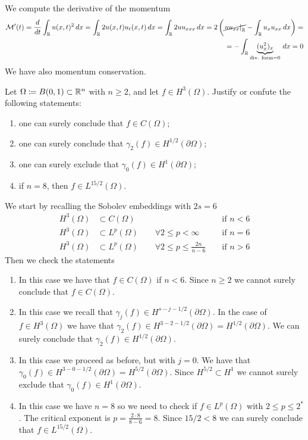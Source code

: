 We compute the derivative of the momentum
\[
    \begin{split}
        \mathcal{M}'(t) = \frac{d}{dt} \int_{\mathbb{R}} u(x,t)^2 \, dx = \int_{\mathbb{R}} 2 u(x,t) u_t(x,t) \, dx = \int_{\mathbb{R}} 2 u u_{xxx} \, dx = 2\left(\cancel{\left. u u_{xx} \right|_{\mathbb{R}}} - \int_{\mathbb{R}} u_x u_{xx} \, dx\right) = \\
        = - \int_{\mathbb{R}} \underbrace{(u_x^2)_x}_{\text{div. form} = 0} \, dx = 0
    \end{split}
\]
We have also momentum conservation.

\newpage
\begin{exercise}
    Let \(\Omega \coloneqq B(0, 1) \subset \mathbb{R}^n\) with \(n \geq 2\), and let \(f \in H^3(\Omega)\). Justify or confute the following statements:
    \begin{enumerate}
        \item one can surely conclude that \(f \in C(\Omega)\);
        \item one can surely conclude that \(\gamma_2(f) \in H^{1/2}(\partial\Omega)\);
        \item one can surely exclude that \(\gamma_0(f) \in H^{1}(\partial\Omega)\);
        \item if \(n = 8\), then \(f \in L^{15/2}(\Omega)\).
    \end{enumerate}
\end{exercise}
We start by recalling the Sobolev embeddings with \(2s = 6\)
\begin{align*}
    H^3(\Omega) &\subset C(\Omega) && \text{ if } n < 6 \\
    H^3(\Omega) &\subset L^p(\Omega) \qquad \forall 2 \leq p < \infty && \text{ if } n = 6 \\
    H^3(\Omega) &\subset L^p(\Omega) \qquad \forall 2 \leq p \leq \frac{2n}{n - 6} && \text{ if } n > 6
\end{align*}
Then we check the statements
\begin{enumerate}
    \item In this case we have that \(f \in C(\Omega)\) if \(n < 6\). Since \(n \geq 2\) we cannot surely conclude that \(f \in C(\Omega)\).
    \item In this case we recall that \(\gamma_j(f) \in H^{s - j - 1/2}(\partial\Omega)\). In the case of \(f \in H^3(\Omega)\) we have that \(\gamma_2(f) \in H^{3 - 2 - 1/2}(\partial\Omega) = H^{1/2}(\partial\Omega)\). We can surely conclude that \(\gamma_2(f) \in H^{1/2}(\partial\Omega)\).
    \item In this case we proceed as before, but with \(j = 0\). We have that \(\gamma_0(f) \in H^{3 - 0 - 1/2}(\partial\Omega) = H^{5/2}(\partial\Omega)\). Since \(H^{5/2} \subset H^1\) we cannot surely exclude that \(\gamma_0(f) \in H^{1}(\partial\Omega)\).
    \item In this case we have \(n = 8\) so we need to check if \(f \in L^p(\Omega)\) with \(2\leq p \leq 2^*\). The critical exponent is \(p = \frac{2\cdot 8}{8 - 6} = 8\). Since \(15/2 < 8\) we can surely conclude that \(f \in L^{15/2}(\Omega)\). 
\end{enumerate}

